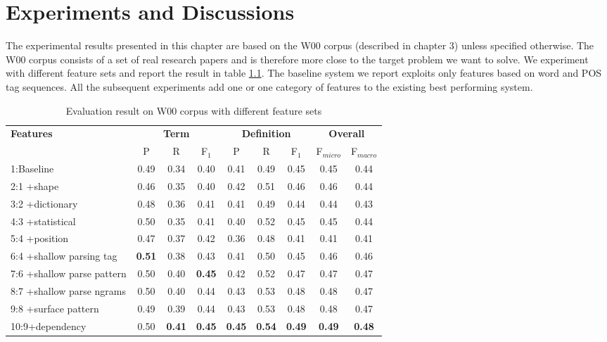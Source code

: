\documentclass[hyp]{socreport}
\begin{document}
\chapter{Experiments and Discussions}

The experimental results presented in this chapter are based on the W00 corpus (described in chapter 3) unless specified otherwise. The W00 corpus consists of a set of real research papers and is therefore more close to the target problem we want to solve. We experiment with different feature sets and report the result in table \ref{evresult}. The baseline system we report exploits only features based on word and POS tag sequences. All the subsequent experiments add one or one category of features to the existing best performing system.   

\begin{table}
\centering	
\begin{tabular}{|p{3cm}|c|c|c|c|c|c|c|c|} 
\hline 
\bf{Features} & \multicolumn{3}{|c|}{\bf{Term}} & \multicolumn{3}{|c|}{\bf{Definition}} & \multicolumn{2}{|c|}{\bf{Overall}} \\ 
\cline{2-9} 
& P &R &F$_1$ & P &R &F$_1$ & F$_{micro}$ &F$_{macro}$\\ 
\hline 
1:Baseline & 0.49 & 0.34 & 0.40 & 0.41 & 0.49 & 0.45 & 0.45 & 0.44 \\ \hline
2:1 +shape & 0.46 & 0.35 & 0.40 & 0.42 & 0.51 & 0.46 & 0.46 & 0.44 \\ \hline
3:2 +dictionary & 0.48 & 0.36 & 0.41 & 0.41 & 0.49 & 0.44 & 0.44 & 0.43 \\ \hline  
4:3 +statistical & 0.50 & 0.35 & 0.41 & 0.40 & 0.52 & 0.45 & 0.45 & 0.44 \\ \hline 
5:4 +position & 0.47 & 0.37 & 0.42 & 0.36 & 0.48 & 0.41 & 0.41 & 0.41 \\ \hline 
6:4 +shallow parsing tag & \bf{0.51} & 0.38 & 0.43 & 0.41 & 0.50 & 0.45 & 0.46 & 0.46 \\ \hline
7:6 +shallow parse pattern & 0.50 & 0.40 & \bf{0.45} & 0.42 & 0.52 & 0.47 & 0.47 & 0.47 \\ \hline  
8:7 +shallow parse ngrams & 0.50 & 0.40 & 0.44 & 0.43 & 0.53 & 0.48 & 0.48 & 0.47 \\ \hline 
9:8 +surface pattern & 0.49 & 0.39 & 0.44 & 0.43 & 0.53 & 0.48 & 0.48 & 0.47 \\ \hline 
10:9+dependency & 0.50 & \bf{0.41} & \bf{0.45} & \bf{0.45} & \bf{0.54} & \bf{0.49} & \bf{0.49} & \bf{0.48} \\ \hline 
\end{tabular} 
\caption{Evaluation result on W00 corpus with different feature sets}
\label{evresult}
\end{table}
\end{document}
